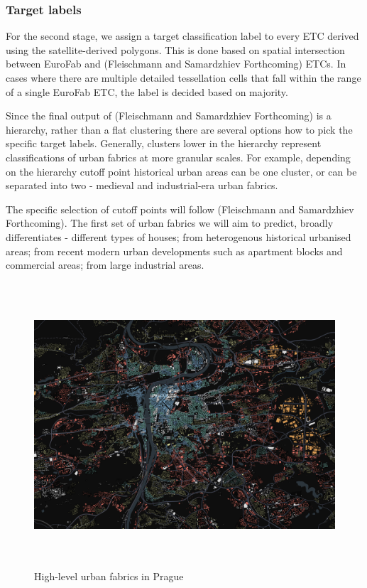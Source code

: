\documentclass[
  letterpaper,
  DIV=11,
  numbers=noendperiod]{scrartcl}
\begin{document}
\subsubsection{Target labels}\label{target-labels}

For the second stage, we assign a target classification label to every
ETC derived using the satellite-derived polygons. This is done based on
spatial intersection between EuroFab and (Fleischmann and Samardzhiev
Forthcoming) ETCs. In cases where there are multiple detailed
tessellation cells that fall within the range of a single EuroFab ETC,
the label is decided based on majority.

Since the final output of (Fleischmann and Samardzhiev Forthcoming) is a
hierarchy, rather than a flat clustering there are several options how
to pick the specific target labels. Generally, clusters lower in the
hierarchy represent classifications of urban fabrics at more granular
scales. For example, depending on the hierarchy cutoff point historical
urban areas can be one cluster, or can be separated into two - medieval
and industrial-era urban fabrics.

The specific selection of cutoff points will follow (Fleischmann and
Samardzhiev Forthcoming). The first set of urban fabrics we will aim to
predict, broadly differentiates - different types of houses; from
heterogenous historical urbanised areas; from recent modern urban
developments such as apartment blocks and commercial areas; from large
industrial areas.

\begin{figure}[H]

{\centering \includegraphics[width=\linewidth,height=4.16667in,keepaspectratio]{../figures/algo_design/prague_600.png}

}

\caption{High-level urban fabrics in Prague}

\end{figure}%
\end{document}
